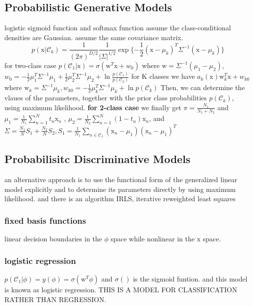 \documentclass[a4paper]{book}
\begin{document}
\subsection{Probabilistic Generative Models}
logistic sigmoid function and softmax function\newline
assume the class-conditional densities are Gaussian. assume the same covariance matrix.
\begin{equation}\label{2.3.1}
  p(\mathrm x|\mathcal C_k) = \frac{1}{(2\pi)^{D/2}}\frac{1}{|\Sigma|^{1/2}}\exp\{-\frac12(\mathrm x-\mu_k)^T\Sigma^{-1}(\mathrm x-\mu_k)\}
\end{equation}
for two-class case $p(\mathcal C_1|\mathrm x) = \sigma(\mathrm w^T\mathrm x+w_0)$\newline
where $\mathrm w = \Sigma^{-1}(\mu_1-\mu_2)$, $w_0 = -\frac12\mu_1^T\Sigma^{-1}\mu_1+\frac12\mu_2^T\Sigma^{-1}\mu_2+\ln\frac{p(\mathcal C_1)}{p(\mathcal C_2)}$\newline
for K classes we have  $a_k(\mathrm x) \mathrm w_k^T\mathrm x+w_{k0}$ where $ \mathrm w_k = \Sigma^{-1}\mu_k, w_{k0} = -\frac12\mu_k^T\Sigma^{-1}\mu_k+\ln p(\mathcal C_k)$
\newline
Then, we can determine the vlaues of the parameters, together with the prior class probabilities $p(\mathcal C_k)$, using maximum likelihood.\newline
\textbf{for 2-class case}\newline
we finally get $\pi = \frac{N_1}{N_1+N_2}$ and $\mu_1 = \frac1{N_1}\sum_{n=1}^Nt_n\mathrm x_n$ , $\mu_2 =\frac1{N_2} \sum_{n=1}^N(1-t_n)\mathrm x_n$, \newline
and $\Sigma =\frac{N_1}{N}S_1+\frac{N_2}{N}S_2, S_1 = \frac{1}{N_1}\sum_{n\in\mathcal C_1}(\mathrm x_n-\mu_1)(\mathrm x_n-\mu_1)^T$
\subsection{Probabilisitc  Discriminative Models}
an alternative approach is to use the functional form of the generalized linear model explicitly and to determine its parameters directly by using maximum likelihood. and there is an algorithm IRLS, iterative reweighted least squares
\subsubsection{fixed basis functions}
linear decision boundaries in the $\phi$ space while nonlinear in the $\mathrm x$ space.
\subsubsection{logistic regression}
$p(\mathcal C_1|\phi) = y(\phi) = \sigma(\mathrm w^T\phi)$  and $\sigma()$ is the sigmoid funtion.  and this model is known as logistic regression.  THIS IS A MODEL FOR CLASSIFICATION RATHER THAN REGRESSION.
\end{document}
